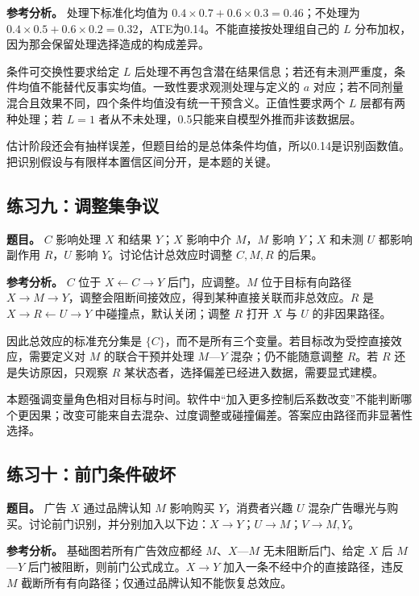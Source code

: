 \textbf{参考分析。} 处理下标准化均值为 $0.4\times0.7+0.6\times0.3=0.46$；不处理为 $0.4\times0.5+0.6\times0.2=0.32$，ATE为0.14。不能直接按处理组自己的 $L$ 分布加权，因为那会保留处理选择造成的构成差异。

条件可交换性要求给定 $L$ 后处理不再包含潜在结果信息；若还有未测严重度，条件均值不能替代反事实均值。一致性要求观测处理与定义的 $a$ 对应；若不同剂量混合且效果不同，四个条件均值没有统一干预含义。正值性要求两个 $L$ 层都有两种处理；若 $L=1$ 者从不未处理，0.5只能来自模型外推而非该数据层。

估计阶段还会有抽样误差，但题目给的是总体条件均值，所以0.14是识别函数值。把识别假设与有限样本置信区间分开，是本题的关键。

\subsection*{练习九：调整集争议}

\textbf{题目。} $C$ 影响处理 $X$ 和结果 $Y$；$X$ 影响中介 $M$，$M$ 影响 $Y$；$X$ 和未测 $U$ 都影响副作用 $R$，$U$ 影响 $Y$。讨论估计总效应时调整 $C,M,R$ 的后果。

\textbf{参考分析。} $C$ 位于 $X\leftarrow C\rightarrow Y$ 后门，应调整。$M$ 位于目标有向路径 $X\rightarrow M\rightarrow Y$，调整会阻断间接效应，得到某种直接关联而非总效应。$R$ 是 $X\rightarrow R\leftarrow U\rightarrow Y$ 中碰撞点，默认关闭；调整 $R$ 打开 $X$ 与 $U$ 的非因果路径。

因此总效应的标准充分集是 $\{C\}$，而不是所有三个变量。若目标改为受控直接效应，需要定义对 $M$ 的联合干预并处理 $M$---$Y$ 混杂；仍不能随意调整 $R$。若 $R$ 还是失访原因，只观察 $R$ 某状态者，选择偏差已经进入数据，需要显式建模。

本题强调变量角色相对目标与时间。软件中“加入更多控制后系数改变”不能判断哪个更因果；改变可能来自去混杂、过度调整或碰撞偏差。答案应由路径而非显著性选择。

\subsection*{练习十：前门条件破坏}

\textbf{题目。} 广告 $X$ 通过品牌认知 $M$ 影响购买 $Y$，消费者兴趣 $U$ 混杂广告曝光与购买。讨论前门识别，并分别加入以下边：$X\rightarrow Y$；$U\rightarrow M$；$V\rightarrow M,Y$。

\textbf{参考分析。} 基础图若所有广告效应都经 $M$、$X$---$M$ 无未阻断后门、给定 $X$ 后 $M$---$Y$ 后门被阻断，则前门公式成立。$X\rightarrow Y$ 加入一条不经中介的直接路径，违反 $M$ 截断所有有向路径；仅通过品牌认知不能恢复总效应。

